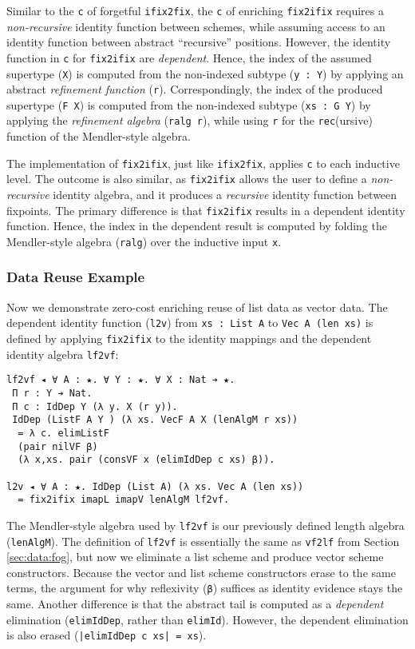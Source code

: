 \documentclass[acmsmall]{acmart}\settopmatter{}
\newcommand{\refsec}[1]{Section \ref{sec:#1}}
\begin{document}
Similar to the \verb;c; of forgetful \verb;ifix2fix;,
the \verb;c; of enriching \verb;fix2ifix; requires a
\textit{non-recursive} identity function between schemes, while assuming
access to an identity function between abstract ``recursive''
positions. However, the identity function in \verb;c; for
\verb;fix2ifix; are \textit{dependent}. Hence, the index of the
assumed supertype (\verb;X;) is computed from the non-indexed
subtype (\verb;y : Y;) by applying an abstract
\textit{refinement function} (\verb;r;).
Correspondingly, the index of the produced supertype
(\verb;F X;) is computed from the non-indexed
subtype (\verb;xs : G Y;) by applying the
\textit{refinement algebra} (\verb;ralg r;), while using \verb;r; for
the \verb;rec;(ursive) function of the Mendler-style algebra.

The implementation of \verb;fix2ifix;, just like \verb;ifix2fix;,
applies \verb;c; to each inductive level. The outcome is also similar,
as \verb;fix2ifix; allows the user to define a \textit{non-recursive}
identity algebra, and it produces a \textit{recursive} identity
function between fixpoints. The primary difference is
that \verb;fix2ifix; results in a dependent identity function. Hence,
the index in the dependent result is computed by folding
the Mendler-style algebra (\verb;ralg;) over the inductive input
\verb;x;. 

\subsubsection{Data Reuse Example}

Now we demonstrate zero-cost enriching reuse of list data as vector
data. The dependent identity function (\verb;l2v;)
from \verb;xs : List A; to \verb;Vec A (len xs); is defined by
applying \verb;fix2ifix; to the identity mappings and the
dependent identity algebra \verb;lf2vf;:

\begin{verbatim}
lf2vf ◂ ∀ A : ★. ∀ Y : ★. ∀ X : Nat ➔ ★.
 Π r : Y ➔ Nat. 
 Π c : IdDep Y (λ y. X (r y)).
 IdDep (ListF A Y ) (λ xs. VecF A X (lenAlgM r xs))
  = λ c. elimListF
  (pair nilVF β)
  (λ x,xs. pair (consVF x (elimIdDep c xs) β)).
 
l2v ◂ ∀ A : ★. IdDep (List A) (λ xs. Vec A (len xs))
  = fix2ifix imapL imapV lenAlgM lf2vf.
\end{verbatim}
The Mendler-style algebra used by \verb;lf2vf; is our previously
defined length algebra (\verb;lenAlgM;).
The definition of \verb;lf2vf; is essentially the same as
\verb;vf2lf; from \refsec{data:fog}, but now we eliminate a list
scheme and produce vector scheme constructors. Because the vector and
list scheme constructors erase to the same terms, the argument for why
reflexivity (\verb;β;) suffices as identity evidence stays the same.
Another difference is that the abstract tail is computed as a \textit{dependent}
elimination (\verb;elimIdDep;, rather than \verb;elimId;).
However, the dependent elimination is also erased
(\verb;|elimIdDep c xs| = xs;).
\end{document}
